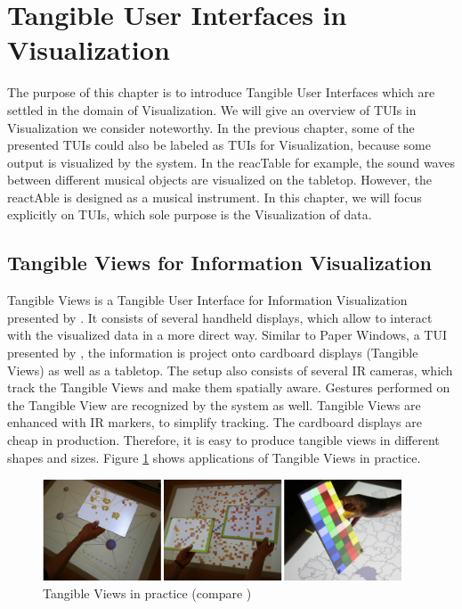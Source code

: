 \section{Tangible User Interfaces in Visualization}
The purpose of this chapter is to introduce Tangible User Interfaces which are settled in the domain of Visualization. We will give an overview of TUIs in Visualization we consider noteworthy. In the previous chapter, some of the presented TUIs could also be labeled as TUIs for Visualization, because some output is visualized by the system. In the reacTable for example, the sound waves between different musical objects are visualized on the tabletop. However, the reactAble is designed as a musical instrument. In this chapter, we will focus explicitly on TUIs, which sole purpose is the Visualization of data.

\subsection{Tangible Views for Information Visualization}
Tangible Views is a Tangible User Interface for Information Visualization presented by \cite{spindler10}. It consists of several handheld displays, which allow to interact with the visualized data in a more direct way. Similar to Paper Windows, a TUI presented by \cite{holman05}, the information is project onto cardboard displays (Tangible Views) as well as a tabletop. The setup also consists of several IR cameras, which track the Tangible Views and make them spatially aware. Gestures performed on the Tangible View are recognized by the system as well. Tangible Views are enhanced with IR markers, to simplify tracking. The cardboard displays are cheap in production. Therefore, it is easy to produce tangible views in different shapes and sizes. Figure \ref{fig:tangible_views} shows applications of Tangible Views in practice. 

\begin{figure}[htb]
\centering
\includegraphics[width=0.95\textwidth]{figures/tangible_views.png}
\caption{Tangible Views in practice (compare )}
\label{fig:tangible_views}
\end{figure}

